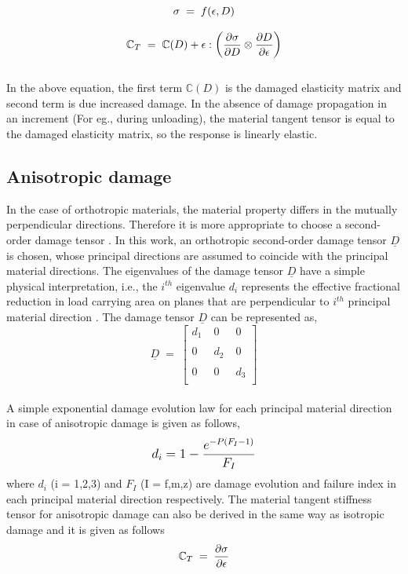 \documentclass[12pt,openright,twoside]{report}
\begin{document}
\begin{equation*}
\large{\sigma  \; = \; f(\epsilon, D) }
\end{equation*}

\begin{equation}
\large{\mathbb{C}_{T}  \; = \; \mathbb{C}(D) + \epsilon : \Big(\frac{\partial \sigma }{\partial D} \otimes \frac{\partial D}{\partial \epsilon}  \Big)    }
\end{equation}
\\
In the above equation, the first term $\mathbb{C}(D)$ is the damaged elasticity matrix and second term is due increased damage. In the absence of damage propagation in an increment (For eg., during unloading), the material tangent tensor is equal to the damaged elasticity matrix, so the response is linearly elastic.
\subsection{Anisotropic damage}
\indent\indent\indent In the case of orthotropic materials, the material property differs in the mutually perpendicular directions. Therefore it is more appropriate to choose a second-order damage tensor \citep{murakami2012continuum}. In this work, an orthotropic second-order damage tensor $\underline{D}$ is chosen, whose principal directions are assumed to coincide with the principal material directions. The eigenvalues of the damage tensor $\underline{D}$ have a simple physical interpretation, i.e., the $i^{th}$ eigenvalue $d_{i}$ represents the effective fractional reduction in load carrying area on planes that are perpendicular to $i^{th}$ principal material direction \citep{wang2009three}. The damage tensor $\underline{D}$ can be represented as,
\\
$$
\underline{D} \; = \; 
 \begin{bmatrix}
  d_{1}  \;& 0  \; & 0  \\
  \\
  0 \; & d_{2} \; & 0  \\
  \\  
  0 \; & 0 \; & d_{3} \\
  
 \end{bmatrix}
 $$  
\\
A simple exponential damage evolution law \citep{wang2009three} for each principal material direction in case of anisotropic damage is given as follows,
\begin{equation}
\mathlarger{d_{i} = 1 - \frac{e^{-P(F_{I} - 1)} }{F_{I}} } 
\label{exponential damage equation}
\end{equation}
where $d_{i}$ (i = 1,2,3) and $F_{I}$ (I = f,m,z) are damage evolution and failure index in each principal material direction respectively.
The material tangent stiffness tensor for anisotropic damage \citep{lapczyk2007progressive} can also be derived in the same way as isotropic damage and it is given as follows
\begin{equation*}
\large{ \mathbb{C}_{T}  \; = \;\frac{\partial \sigma}{\partial \epsilon}  }
\end{equation*}
\end{document}
